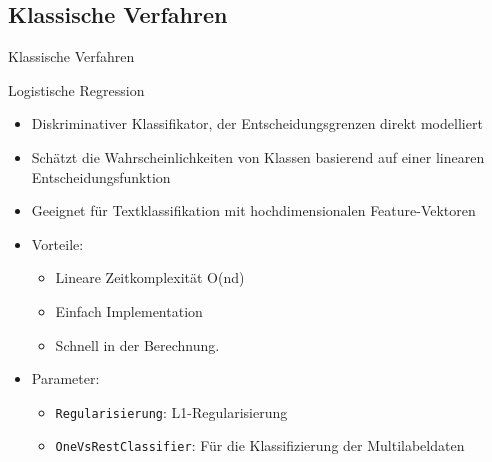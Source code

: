 \documentclass[aspectratio=169]{beamer} %
\begin{document}
\subsection{Klassische Verfahren}

\begin{frame}{Klassische Verfahren}
    \begin{block}{Logistische Regression}
        \begin{itemize}
            \item Diskriminativer Klassifikator, der Entscheidungsgrenzen direkt modelliert
            \item Schätzt die Wahrscheinlichkeiten von Klassen basierend auf einer linearen Entscheidungsfunktion
            \item Geeignet für Textklassifikation mit hochdimensionalen Feature-Vektoren
            \item Vorteile:
                  \begin{itemize}
                      \item Lineare Zeitkomplexität O(nd) %
                      \item Einfach Implementation
                      \item Schnell in der Berechnung.
                  \end{itemize}
            \item Parameter:
                  \begin{itemize}
                      \item \texttt{Regularisierung}: L1-Regularisierung
                      \item \texttt{OneVsRestClassifier}: Für die Klassifizierung der Multilabeldaten
                  \end{itemize}
        \end{itemize}
    \end{block}
\end{frame}
\end{document}
